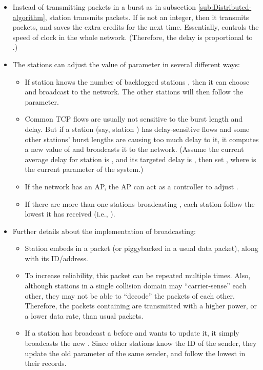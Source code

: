 \documentclass[letterpaper, 10 pt, conference]{ieeeconf}
\begin{document}
\begin{itemize}
\item Instead of transmitting  packets in a burst as in subsection
\ref{sub:Distributed-algorithm}, station  transmits 
packets. If  is not an integer, then it transmits
 packets, and saves
the extra credits 
for the next time. Essentially,  controls the speed of clock in
the whole network. (Therefore, the delay is proportional to .)
\item The stations can adjust the value of parameter  in several different ways:

\begin{itemize}
\item If station  knows the number of backlogged stations , then
it can choose  and broadcast  to the network.
The other stations will then follow the parameter. 
\item Common TCP flows are usually not sensitive to the burst length and
delay. But if a station (say, station ) has delay-sensitive flows
and some other stations' burst lengths are causing too much delay
to it, it computes a new value of  and broadcasts it to the
network. (Assume the current average delay for station  is ,
and its targeted delay is , then set ,
where  is the current parameter of the system.) 
\item If the network has an AP, the AP can act as a controller to adjust
.
\item If there are more than one stations broadcasting , each station
follow the lowest  it has received (i.e., ).
\end{itemize}
\item Further details about the implementation of broadcasting: 

\begin{itemize}
\item Station  embeds  in a packet (or piggybacked in a usual
data packet), along with its ID/address. 
\item To increase reliability, this packet can be repeated multiple times.
Also, although stations in a single collision domain may {}``carrier-sense''
each other, they may not be able to {}``decode'' the packets of
each other. Therefore, the packets containing  are transmitted
with a higher power, or a lower data rate, than usual packets. 
\item If a station has broadcast a  before and wants to update it,
it simply broadcasts the new . Since other stations know the
ID of the sender, they update the old parameter of the same sender,
and follow the lowest  in their records.
\end{itemize}
\end{itemize}
\end{document}
